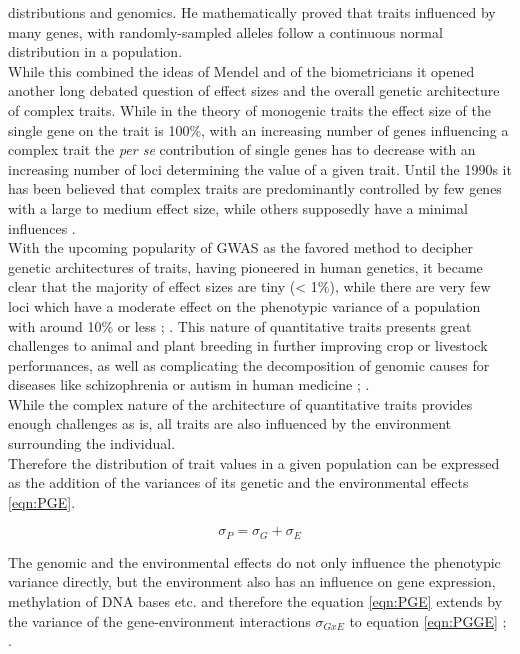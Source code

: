 distributions and genomics. He mathematically proved that traits influenced by many genes,
with randomly-sampled alleles follow a continuous normal distribution in a
population. \\
While this combined the ideas of Mendel and of the biometricians it opened another long
debated question of effect sizes and the overall genetic architecture of complex
traits. While in the theory of monogenic traits the effect size of the single gene on the
trait is 100\%, with an increasing number of genes influencing a complex trait the
\textit{per se} contribution of single genes has to decrease with an increasing number of
loci determining the value of a given trait. Until the 1990s it has been believed that
complex traits are predominantly controlled by few genes with a
large to medium effect size, while others supposedly have a minimal influences \cite{zhang2018esti}. \\
With the upcoming popularity of GWAS as the favored method to decipher genetic
architectures of traits, having pioneered in human genetics, it became clear that the
majority of effect sizes are tiny (< 1\%), while there are very few loci which have a
moderate effect on the phenotypic variance of a population with around 10\% or less
\cite{korte2013advantages}; \cite{stringer2011}. This nature of quantitative traits
presents great challenges to animal \cite{goddard2009} and plant breeding
\cite{wurschum2012} in further improving crop or livestock performances, as well as
complicating the decomposition of genomic causes for diseases like schizophrenia or autism in human medicine \cite{de2014}; \cite{purcell2014}. \\
While the complex nature of the architecture of quantitative traits provides enough
challenges as is, all traits are also influenced by the environment surrounding the individual.\\
Therefore the distribution of trait values in a given population can be expressed as the
addition of the variances of its genetic and the environmental effects \ref{eqn:PGE}.

\begin{equation}
 \sigma_{P} = \sigma_{G} + \sigma_{E}
 \label{eqn:PGE}
\end{equation}

The genomic and the environmental effects do not only influence the phenotypic variance directly, but
the environment also has an influence on gene expression, methylation of DNA bases etc. and
therefore the equation \ref{eqn:PGE} extends by the variance of the gene-environment
interactions $\sigma_{GxE}$  to equation \ref{eqn:PGGE}  \cite{lynch1998}; \cite{walsh2018}.
    
